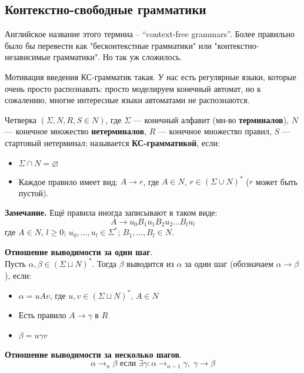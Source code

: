 \subsection{Контекстно-свободные грамматики}

Английское название этого термина -- ``context-free grammars''. Более правильно было бы перевести как "бесконтекстные грамматики" или "контекстно-независимые грамматики". Но так уж сложилось.

Мотивация введения КС-грамматик такая. У нас есть регулярные языки, которые очень просто распознавать: просто моделируем конечный автомат, но к сожалению, многие интересные языки автоматами не распознаются.

\begin{conj}
    Четверка $(\Sigma, N, R, S \in N)$, где $\Sigma$ --- конечный алфавит (мн-во \textbf{терминалов}), $N$ --- конечное множество \textbf{нетерминалов}, $R$ --- конечное множество правил, $S$ --- стартовый нетерминал; называется \textbf{КС-грамматикой}, если:
    \begin{itemize}
        \item $\Sigma \cap N = \varnothing$
        \item Каждое правило имеет вид: $A \to r$, 
        где $A \in N$, $r \in (\Sigma \cup N)^*$ ($r$ может быть пустой).
    \end{itemize}
\end{conj}  

\textbf{Замечание.} Ещё правила иногда записывают в таком виде:
    $$ A \to u_0 B_1 u_1 B_2 u_2 \dots B_l u_l $$
где $A \in N$, $l \geqslant 0$; $u_0, \dots, u_l \in \Sigma^*$; $B_1, \dots, B_l \in N$.

\begin{conj}
    \textbf{Отношение выводимости за один шаг}. \\ 
    Пусть $\alpha, \beta \in (\Sigma \sqcup N)^*$. Тогда $\beta$ выводится из $\alpha$ за один шаг (обозначаем $\alpha \to \beta$), если:
    \begin{itemize}
        \item $\alpha = u A v$, где $u, v \in (\Sigma \sqcup N)^*$, $A \in N$
        \item Есть правило $A \to \gamma$ в $R$
        \item $\beta = u \gamma v$
    \end{itemize}
\end{conj}

\begin{conj}
    \textbf{Отношение выводимости за несколько шагов}.
    $$ \alpha \to_n \beta \text{ если } \exists \gamma : \alpha \to_{n-1} \gamma, \; \gamma \to \beta $$
\end{conj}

